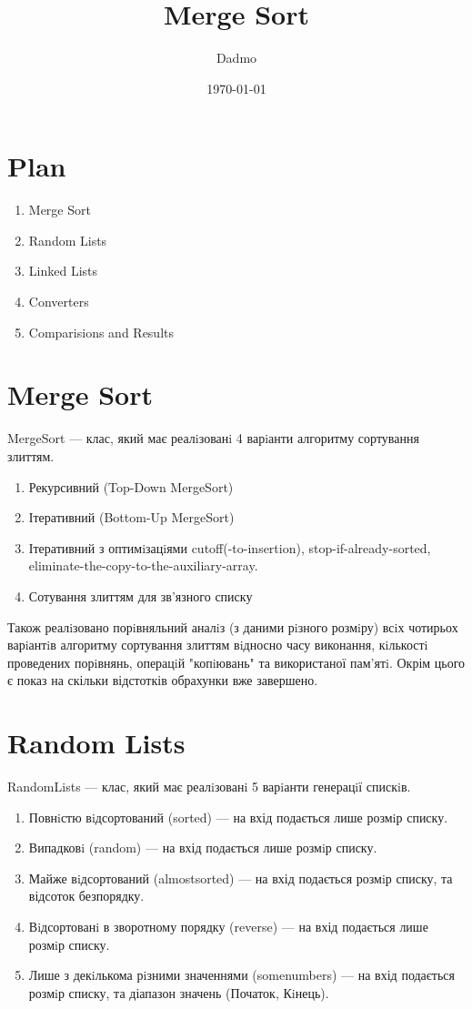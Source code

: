 \documentclass{article}
\title{Merge Sort}
\author{Dadmo}
\date{\today}
\begin{document}
\maketitle

\section{Plan}
\begin{enumerate}
    \item Merge Sort
    \item Random Lists
    \item Linked Lists
    \item Converters
    \item Comparisions and Results
\end{enumerate}
    \section{Merge Sort}
    MergeSort --- клас, який має реалiзованi 4 варiанти алгоритму сортування злиттям. 
    \begin{enumerate}
        \item Рекурсивний (Top-Down MergeSort)
        \item Ітеративний (Bottom-Up MergeSort)
        \item Ітеративний з оптимiзацiями cutoff(-to-insertion), stop-if-already-sorted, eliminate-the-copy-to-the-auxiliary-array.
        \item Сотування злиттям для зв’язного списку
    \end{enumerate}
    Також реалiзовано порiвняльний аналiз (з даними рiзного розмiру) всiх чотирьох варiантiв
    алгоритму сортування злиттям вiдносно часу виконання, кiлькостi проведених
    порiвнянь, операцiй "копiювань" та використаної пам’ятi. Окрім цього є показ на скільки відстотків обрахунки вже завершено.
    \newline
    \section{Random Lists}
    RandomLists --- клас, який має реалiзованi 5 варiанти генерацiї спискiв.
    \begin{enumerate}
        \item Повнiстю вiдсортований (sorted) --- на вхід подається лише розмiр списку.
        \item Випадковi (random) --- на вхід подається лише розмiр списку.
        \item Майже вiдсортований (almostsorted) --- на вхід подається розмiр списку, та відсоток безпорядку.
        \item Вiдсортованi в зворотному порядку (reverse) --- на вхід подається лише розмiр списку.
        \item Лише з декiлькома рiзними значеннями (somenumbers) --- на вхід подається розмiр списку, та діапазон значень (Початок, Кiнець).
    \end{enumerate}
\end{document}
